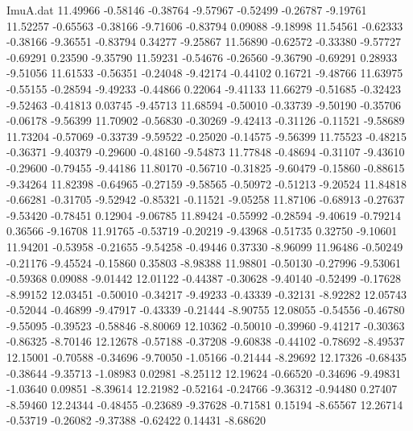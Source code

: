 \begin{filecontents}{ImuA.dat}
  11.49966   -0.58146   -0.38764   -9.57967   -0.52499   -0.26787   -9.19761
  11.52257   -0.65563   -0.38166   -9.71606   -0.83794    0.09088   -9.18998
  11.54561   -0.62333   -0.38166   -9.36551   -0.83794    0.34277   -9.25867
  11.56890   -0.62572   -0.33380   -9.57727   -0.69291    0.23590   -9.35790
  11.59231   -0.54676   -0.26560   -9.36790   -0.69291    0.28933   -9.51056
  11.61533   -0.56351   -0.24048   -9.42174   -0.44102    0.16721   -9.48766
  11.63975   -0.55155   -0.28594   -9.49233   -0.44866    0.22064   -9.41133
  11.66279   -0.51685   -0.32423   -9.52463   -0.41813    0.03745   -9.45713
  11.68594   -0.50010   -0.33739   -9.50190   -0.35706   -0.06178   -9.56399
  11.70902   -0.56830   -0.30269   -9.42413   -0.31126   -0.11521   -9.58689
  11.73204   -0.57069   -0.33739   -9.59522   -0.25020   -0.14575   -9.56399
  11.75523   -0.48215   -0.36371   -9.40379   -0.29600   -0.48160   -9.54873
  11.77848   -0.48694   -0.31107   -9.43610   -0.29600   -0.79455   -9.44186
  11.80170   -0.56710   -0.31825   -9.60479   -0.15860   -0.88615   -9.34264
  11.82398   -0.64965   -0.27159   -9.58565   -0.50972   -0.51213   -9.20524
  11.84818   -0.66281   -0.31705   -9.52942   -0.85321   -0.11521   -9.05258
  11.87106   -0.68913   -0.27637   -9.53420   -0.78451    0.12904   -9.06785
  11.89424   -0.55992   -0.28594   -9.40619   -0.79214    0.36566   -9.16708
  11.91765   -0.53719   -0.20219   -9.43968   -0.51735    0.32750   -9.10601
  11.94201   -0.53958   -0.21655   -9.54258   -0.49446    0.37330   -8.96099
  11.96486   -0.50249   -0.21176   -9.45524   -0.15860    0.35803   -8.98388
  11.98801   -0.50130   -0.27996   -9.53061   -0.59368    0.09088   -9.01442
  12.01122   -0.44387   -0.30628   -9.40140   -0.52499   -0.17628   -8.99152
  12.03451   -0.50010   -0.34217   -9.49233   -0.43339   -0.32131   -8.92282
  12.05743   -0.52044   -0.46899   -9.47917   -0.43339   -0.21444   -8.90755
  12.08055   -0.54556   -0.46780   -9.55095   -0.39523   -0.58846   -8.80069
  12.10362   -0.50010   -0.39960   -9.41217   -0.30363   -0.86325   -8.70146
  12.12678   -0.57188   -0.37208   -9.60838   -0.44102   -0.78692   -8.49537
  12.15001   -0.70588   -0.34696   -9.70050   -1.05166   -0.21444   -8.29692
  12.17326   -0.68435   -0.38644   -9.35713   -1.08983    0.02981   -8.25112
  12.19624   -0.66520   -0.34696   -9.49831   -1.03640    0.09851   -8.39614
  12.21982   -0.52164   -0.24766   -9.36312   -0.94480    0.27407   -8.59460
  12.24344   -0.48455   -0.23689   -9.37628   -0.71581    0.15194   -8.65567
  12.26714   -0.53719   -0.26082   -9.37388   -0.62422    0.14431   -8.68620

\end{filecontents}
